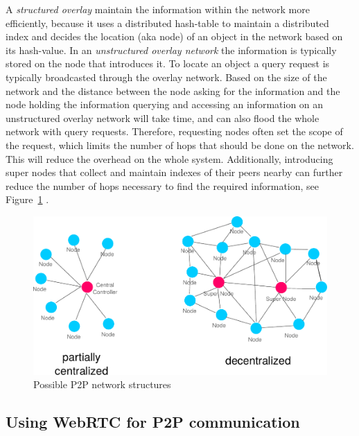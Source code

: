 A \emph{structured overlay} maintain the information within the network more efficiently, because it uses a distributed hash-table to maintain a distributed index and decides the location (aka node) of an object in the network based on its hash-value. In an \emph{unstructured overlay network} the information is typically stored on the node that introduces it. To locate an object a query request is typically broadcasted through the overlay network. Based on the size of the network and the distance between the node asking for the information and the node holding the information querying and accessing an information on an unstructured overlay network will take time, and can also flood the whole network with query requests. Therefore, requesting nodes often set the scope of the request, which limits the number of hops that should be done on the network. This will reduce the overhead on the whole system. Additionally, introducing super nodes that collect and maintain indexes of their peers nearby can further reduce the number of hops necessary to find the required information, see Figure~\ref{fig:p2p_network_structures} \citep{rodrigues2010peer}. \@

\begin{figure}[H]
	\centering
		\includegraphics[width=0.8\columnwidth]{images/p2p_network_structures.pdf}
	\caption{Possible \gls{P2P} network structures}
\label{fig:p2p_network_structures}
\end{figure}


\subsection{Using \gls{WebRTC} for \gls{P2P} communication}
\label{sec:p2p_webrtc}

